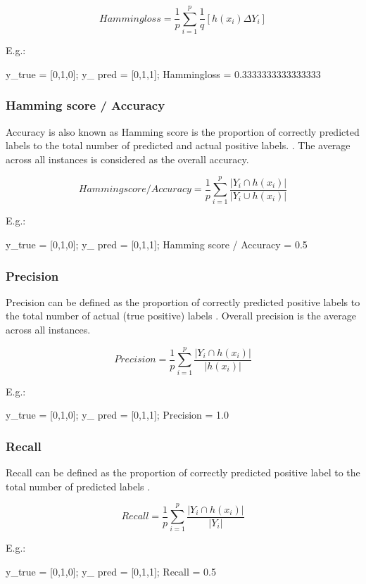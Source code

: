  $$Hammingloss = \frac{1}{p}\sum_{i =1}^{p}\frac{1}{q}[h(x_i) \Delta Y_i]$$ \cite{zhang2010multi}
 

E.g.: 

y\_true = [0,1,0]; 
y\_ pred = [0,1,1];  
Hammingloss = 0.3333333333333333


\subsubsection{Hamming score / Accuracy}

 Accuracy is also known as Hamming score is the proportion of correctly predicted labels to the total number of predicted and actual positive labels. \cite{sorower2010literature}.  The average across all instances is considered as the overall accuracy.

$$Hamming score / Accuracy = \frac{1}{p}\sum_{i =1}^{p}\frac{|Y_i \cap h(x_i)|}{|Y_i \cup h(x_i)|}$$ \cite{zhang2010multi}


E.g.: 

y\_true = [0,1,0]; 
y\_ pred = [0,1,1];  
Hamming score / Accuracy = 0.5

\subsubsection{Precision}

Precision can be defined as the proportion of correctly predicted positive labels to the total number of actual (true positive)
labels \cite{sorower2010literature}. Overall precision is the average across all instances.

$$Precision = \frac{1}{p}\sum_{i =1}^{p}\frac{|Y_i \cap h(x_i)|}{|h(x_i)|}$$ \cite{zhang2010multi}

E.g.: 

y\_true = [0,1,0]; 
y\_ pred = [0,1,1];  
Precision = 1.0

\subsubsection{Recall}

Recall can be defined as the proportion of correctly predicted positive label to the total number of predicted labels \cite{sorower2010literature}.

$$Recall = \frac{1}{p}\sum_{i =1}^{p}\frac{|Y_i \cap h(x_i)|}{|Y_i|}$$ \cite{zhang2010multi}

E.g.: 

y\_true = [0,1,0]; 
y\_ pred = [0,1,1];  
Recall = 0.5

